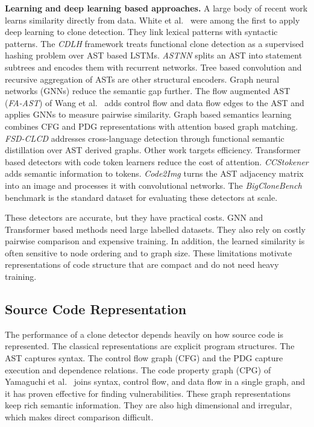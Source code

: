 \documentclass[authoryear,final,5p,times,twocolumn]{elsarticle}
\theoremstyle{plain}
\begin{document}
\textbf{Learning and deep learning based approaches.} A large body of
recent work learns similarity directly from data. White et al.\
\cite{white2016deep} were among the first to apply deep learning to clone
detection. They link lexical patterns with syntactic patterns. The
\emph{CDLH} framework \cite{wei2017cdlh} treats functional clone detection
as a supervised hashing problem over AST based LSTMs. \emph{ASTNN}
\cite{zhang2019astnn} splits an AST into statement subtrees and encodes
them with recurrent networks. Tree based convolution
\cite{yu2019neural} and recursive aggregation of ASTs
\cite{buch2019learning} are other structural encoders. Graph neural
networks (GNNs) reduce the semantic gap further. The flow augmented AST
(\emph{FA-AST}) of Wang et al.\ \cite{wang2020faast} adds control flow and
data flow edges to the AST and applies GNNs to measure pairwise
similarity. Graph based semantics learning \cite{yu2023graphsemantics}
combines CFG and PDG representations with attention based graph matching.
\emph{FSD-CLCD} \cite{zhang2024fsdclcd} addresses cross-language detection
through functional semantic distillation over AST derived graphs. Other
work targets efficiency. Transformer based detectors with code token
learners \cite{zhang2023efficient} reduce the cost of attention.
\emph{CCStokener} \cite{wang2023ccstokener} adds semantic information to
tokens. \emph{Code2Img} \cite{hu2023code2img} turns the AST adjacency
matrix into an image and processes it with convolutional networks. The
\emph{BigCloneBench} benchmark \cite{svajlenko2014bigclonebench} is the
standard dataset for evaluating these detectors at scale.

These detectors are accurate, but they have practical costs. GNN and
Transformer based methods need large labelled datasets. They also rely on
costly pairwise comparison and expensive training. In addition, the
learned similarity is often sensitive to node ordering and to graph size.
These limitations motivate representations of code structure that are
compact and do not need heavy training.

\subsection{Source Code Representation}
\label{subsec:representation}

The performance of a clone detector depends heavily on how source code is
represented. The classical representations are explicit program
structures. The AST captures syntax. The control flow graph (CFG) and the
PDG capture execution and dependence relations. The code property graph
(CPG) of Yamaguchi et al.\ \cite{yamaguchi2014cpg} joins syntax, control
flow, and data flow in a single graph, and it has proven effective for
finding vulnerabilities. These graph representations keep rich semantic
information. They are also high dimensional and irregular, which makes
direct comparison difficult.
\end{document}
